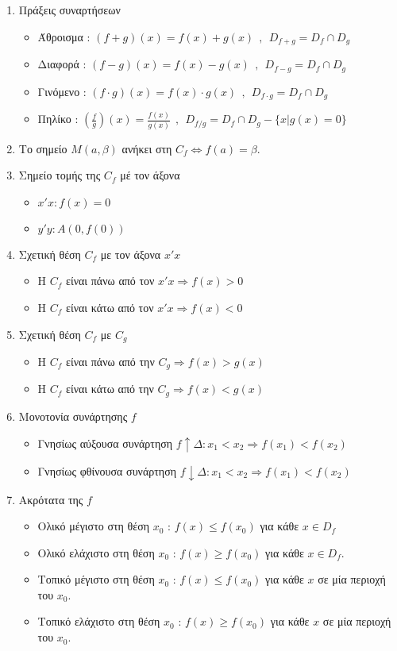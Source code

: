 \documentclass[a4paper,11pt,twoside]{article}
\begin{document}
\begin{enumerate}[resume]
\item Πράξεις συναρτήσεων
\begin{itemize}
\item Άθροισμα : $(f+g)(x)=f(x)+g(x)\ \ ,\ \ D_{f+g}=D_f\cap D_g$
\item Διαφορά : $(f-g)(x)=f(x)-g(x)\ \ ,\ \ D_{f-g}=D_f\cap D_g$
\item Γινόμενο : $(f\cdot g)(x)=f(x)\cdot g(x)\ \ ,\ \ D_{f\cdot g}=D_f\cap D_g$
\item Πηλίκο : $\left(\frac{f}{g}\right)(x)=\frac{f(x)}{g(x)}\ \ ,\ \ D_{f/g}=D_f\cap D_g-\{x|g(x)=0\}$
\end{itemize}
\item Το σημείο $ M(a,\beta) $ ανήκει στη $C_f\Leftrightarrow f(a)=\beta$.
\item Σημείο τομής της $C_f$ μέ τον άξονα
\begin{multicols}{2}
\begin{itemize}
\item $x'x : f(x)=0$
\item $y'y : A(0,f(0))$
\end{itemize}
\end{multicols}
\item Σχετική θέση $C_f$ με τον άξονα $x'x$
\begin{itemize}
\item Η $C_f$ είναι πάνω από τον $x'x\Rightarrow f(x)>0$
\item Η $C_f$ είναι κάτω από τον $x'x\Rightarrow f(x)<0$
\end{itemize}
\item Σχετική θέση $C_f$ με $C_g$
\begin{itemize}
\item Η $C_f$ είναι πάνω από την $C_g\Rightarrow f(x)>g(x)$
\item Η $C_f$ είναι κάτω από την $C_g\Rightarrow f(x)<g(x)$
\end{itemize}
\item Μονοτονία συνάρτησης $f$
\begin{itemize}
\item Γνησίως αύξουσα συνάρτηση $f\uparrow\varDelta : x_1<x_2\Rightarrow f(x_1)<f(x_2)$
\item Γνησίως φθίνουσα συνάρτηση $f\downarrow\varDelta : x_1<x_2\Rightarrow f(x_1)<f(x_2)$
\end{itemize}
\item Ακρότατα της $f$
\begin{itemize}
\item Ολικό μέγιστο στη θέση $x_0$ : $f(x)\leq f(x_0)$ για κάθε $x\in D_f $
\item Ολικό ελάχιστο στη θέση $ x_0 $ : $f(x)\geq f(x_0)$ για κάθε $x\in D_f$.
\item Τοπικό μέγιστο στη θέση $x_0$ : $f(x)\leq f(x_0)$ για κάθε $x$ σε μία περιοχή του $x_0$.
\item Τοπικό ελάχιστο στη θέση $ x_0 $ : $f(x)\geq f(x_0)$ για κάθε $x$ σε μία περιοχή του $x_0$.
\end{itemize}
\end{enumerate}
\end{document}
